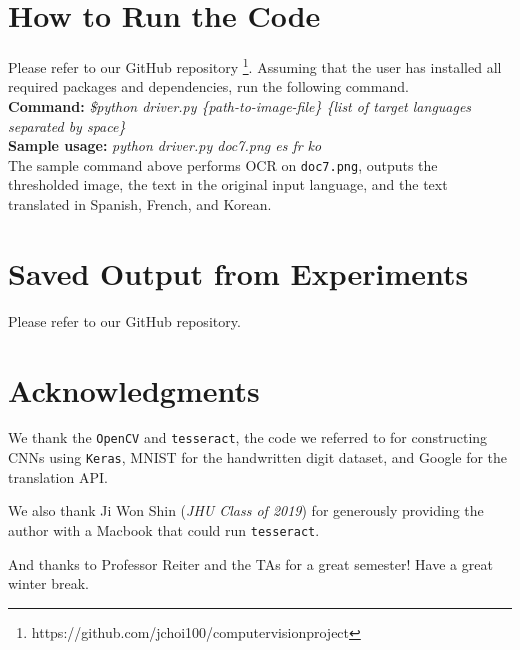 \documentclass[11pt,letterpaper]{article}
\begin{document}
\section*{How to Run the Code}

Please refer to our GitHub repository \footnote{https://github.com/jchoi100/computer\textunderscore vision\textunderscore project}. Assuming that the user has installed all required packages and dependencies, run the following command.\\

\textbf{Command:} \textit{ \$python driver.py \{path-to-image-file\} \{list of target languages separated by space\}}\\

\textbf{Sample usage:} \textit{python driver.py doc7.png es fr ko}\\

The sample command above performs OCR on {\tt doc7.png}, outputs the thresholded image, the text in the original input language, and the text translated in Spanish, French, and Korean.

\section*{Saved Output from Experiments}

Please refer to our GitHub repository.

\section*{Acknowledgments}

We thank the {\tt OpenCV} and {\tt tesseract}, the code we referred to for constructing CNNs using {\tt Keras},  MNIST for the handwritten digit dataset, and Google for the translation API.

We also thank Ji Won Shin (\textit{JHU Class of 2019}) for generously providing the author with a Macbook that could run {\tt tesseract}.

And thanks to Professor Reiter and the TAs for a great semester! Have a great winter break.
\end{document}
